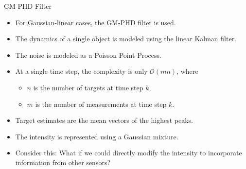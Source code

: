 \begin{frame}{GM-PHD Filter}
    \begin{itemize}
        \item For Gaussian-linear cases, the GM-PHD filter is used.
        \pause
        \item The dynamics of a single object is modeled using the linear Kalman filter.
        \pause
        \item The noise is modeled as a Poisson Point Process.
        \pause
        \item At a single time step, the complexity is only $\mathcal O(mn)$, where
            \begin{itemize}
                \item $n$ is the number of targets at time step $k$,
                \item $m$ is the number of measurements at time step $k$.
            \end{itemize}
        \pause
        \item Target estimates are the mean vectors of the highest peaks.
        \pause
        \item The intensity is represented using a Gaussian mixture.
        \pause
        \item \alert{Consider this: What if we could directly modify the intensity to incorporate information from other sensors?}
    \end{itemize}
\end{frame}
